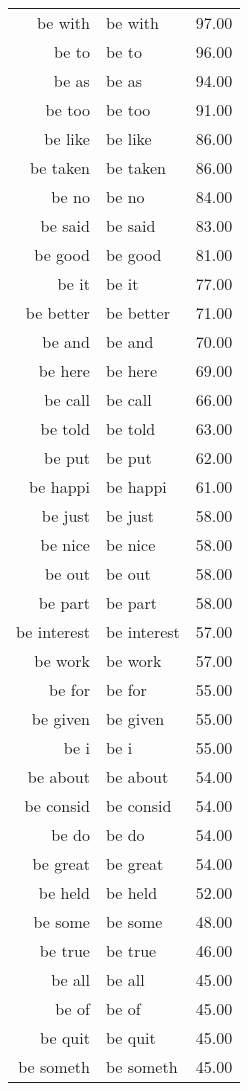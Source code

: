 \begin{table}[ht]
\begin{tabular}{rlr}
  be with & be with & 97.00 \\ 
  be to & be to & 96.00 \\ 
  be as & be as & 94.00 \\ 
  be too & be too & 91.00 \\ 
  be like & be like & 86.00 \\ 
  be taken & be taken & 86.00 \\ 
  be no & be no & 84.00 \\ 
  be said & be said & 83.00 \\ 
  be good & be good & 81.00 \\ 
  be it & be it & 77.00 \\ 
  be better & be better & 71.00 \\ 
  be and & be and & 70.00 \\ 
  be here & be here & 69.00 \\ 
  be call & be call & 66.00 \\ 
  be told & be told & 63.00 \\ 
  be put & be put & 62.00 \\ 
  be happi & be happi & 61.00 \\ 
  be just & be just & 58.00 \\ 
  be nice & be nice & 58.00 \\ 
  be out & be out & 58.00 \\ 
  be part & be part & 58.00 \\ 
  be interest & be interest & 57.00 \\ 
  be work & be work & 57.00 \\ 
  be for & be for & 55.00 \\ 
  be given & be given & 55.00 \\ 
  be i & be i & 55.00 \\ 
  be about & be about & 54.00 \\ 
  be consid & be consid & 54.00 \\ 
  be do & be do & 54.00 \\ 
  be great & be great & 54.00 \\ 
  be held & be held & 52.00 \\ 
  be some & be some & 48.00 \\ 
  be true & be true & 46.00 \\ 
  be all & be all & 45.00 \\ 
  be of & be of & 45.00 \\ 
  be quit & be quit & 45.00 \\ 
  be someth & be someth & 45.00 \\ 

\end{tabular}
\end{table}
